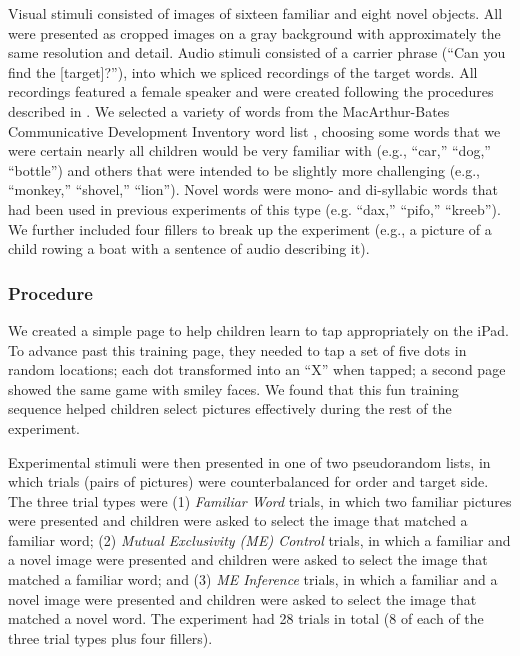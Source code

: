 \documentclass[man,noapacite]{apa2}
\begin{document}
Visual stimuli consisted of images of sixteen familiar and eight novel objects. All were presented as cropped images on a gray background with approximately the same resolution and detail.  Audio stimuli consisted of a carrier phrase (``Can you find the [target]?''), into which we spliced recordings of the target words. All recordings featured a female speaker and were created following the procedures described in . We selected a variety of words from the MacArthur-Bates Communicative Development Inventory word list \cite{fenson1994,fenson2007}, choosing some words that we were certain nearly all children would be very familiar with (e.g., ``car,'' ``dog,'' ``bottle'') and others that were intended to be slightly more challenging (e.g., ``monkey,'' ``shovel,'' ``lion''). Novel words were mono- and di-syllabic words that had been used in previous experiments of this type (e.g. ``dax,'' ``pifo,'' ``kreeb''). We further included four fillers to break up the experiment (e.g., a picture of a child rowing a boat with a sentence of audio describing it).

\subsubsection{Procedure}

We created a simple page to help children learn to tap appropriately on the iPad. To advance past this training page, they needed to tap a set of five dots in random locations; each dot transformed into an ``X'' when tapped; a second page showed the same game with smiley faces. We found that this fun training sequence helped children select pictures effectively during the rest of the experiment.

Experimental stimuli were then presented in one of two pseudorandom lists, in which trials (pairs of pictures) were counterbalanced for order and target side. The three trial types were (1) \emph{Familiar Word} trials, in which two familiar pictures were presented and children were asked to select the image that matched a familiar word; (2) \emph{Mutual Exclusivity (ME) Control} trials, in which a familiar and a novel image were presented and children were asked to select the image that matched a familiar word; and (3) \emph{ME Inference} trials, in which a familiar and a novel image were presented and children were asked to select the image that matched a novel word. The experiment had 28 trials in total (8 of each of the three trial types plus four fillers). 
\end{document}
